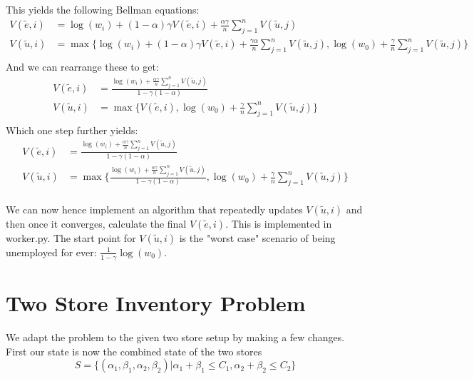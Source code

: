 \documentclass{article}[12pt]
\begin{document}
This yields the following Bellman equations:
\begin{align*}
V(\tilde{e}, i) &= \log(w_i) + (1-\alpha)\gamma V(\tilde{e},i) + \frac{\alpha\gamma}{n} \sum_{j=1}^n V(\tilde{u}, j)\\
V(\tilde{u}, i) &= \max\{\log(w_i) + (1-\alpha)\gamma V(\tilde{e},i) + \frac{\gamma\alpha}{n} \sum_{j=1}^n V(\tilde{u}, j), \log(w_0)+ \frac{\gamma}{n} \sum_{j=1}^n V(\tilde{u}, j)\}\\
\end{align*}
And we can rearrange these to get:
\begin{align*}
V(\tilde{e}, i) &= \frac{\log(w_i) + \frac{\alpha\gamma}{n} \sum_{j=1}^n V(\tilde{u}, j)}{1-\gamma(1-\alpha)}\\
V(\tilde{u}, i)& =  \max\{V(\tilde{e},i), \log(w_0)+ \frac{\gamma}{n} \sum_{j=1}^n V(\tilde{u}, j)\} \\
\end{align*}
Which one step further yields:
\begin{align*}
V(\tilde{e}, i) &= \frac{\log(w_i) + \frac{\alpha\gamma}{n} \sum_{j=1}^n V(\tilde{u}, j)}{1-\gamma(1-\alpha)}\\
V(\tilde{u}, i)& =  \max\{ \frac{\log(w_i) + \frac{\alpha\gamma}{n} \sum_{j=1}^n V(\tilde{u}, j)}{1-\gamma(1-\alpha)}, \log(w_0)+ \frac{\gamma}{n} \sum_{j=1}^n V(\tilde{u}, j)\} \\
\end{align*}

We can now hence implement an algorithm that repeatedly updates $V(\tilde{u}, i)$ and then once it converges, calculate the final $V(\tilde{e}, i)$. This is implemented in worker.py. The start point for $V(\tilde{u}, i)$ is the "worst case" scenario of being unemployed for ever: $\frac{1}{1-\gamma}{\log(w_0)}$.

\section{Two Store Inventory Problem}
We adapt the problem to the given two store setup by making a few changes. First our state is now the combined state of the two stores
$$ S = \{(\alpha_1,\beta_1,\alpha_2,\beta_2) | \alpha_1+\beta_1 \leq C_1,  \alpha_2+\beta_2 \leq C_2\}  $$
\end{document}
